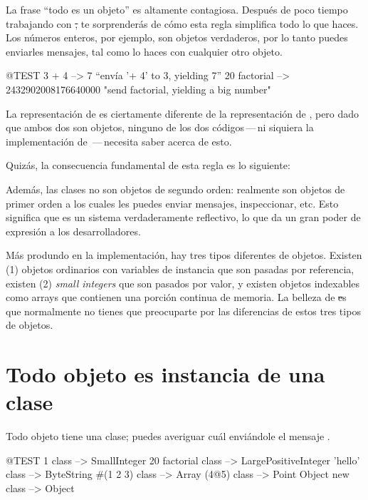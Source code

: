 \documentclass[a4paper,10pt,twoside]{book}
\begin{document}

La frase ``todo es un objeto'' es altamente contagiosa.
Despu\'es de poco tiempo trabajando con \st, te sorprender\'as de c\'omo esta regla simplifica todo lo que haces.  
Los n\'umeros enteros, por ejemplo, son objetos verdaderos, por lo tanto puedes enviarles mensajes, tal como lo haces con cualquier otro objeto.


\begin{code}{@TEST}
3 + 4            --> 7    ``env\'ia '+ 4' to 3, yielding 7''
20 factorial  --> 2432902008176640000   "send factorial, yielding a big number"
\end{code}

La representaci\'on de  es ciertamente diferente de la representaci\'on de , pero dado que ambos dos son objetos, ninguno de los dos c\'odigos\,---\,ni siquiera la implementaci\'on de \,---\,necesita saber acerca de esto.  

Quiz\'as, la consecuencia fundamental de esta regla es lo siguiente:

Adem\'as, las clases no son objetos de segundo orden: realmente son objetos de primer orden a los cuales les puedes enviar mensajes, inspeccionar, etc.
Esto significa que \pharo es un sistema verdaderamente reflectivo, lo que da un gran poder de expresi\'on a los desarrolladores.

M\'as produndo en la implementaci\'on, hay tres tipos diferentes de objetos. Existen (1) objetos ordinarios con variables de instancia que son pasadas por referencia, existen (2) \emph{small integers} %
que son pasados por valor, y existen objetos indexables como arrays que contienen una porci\'on continua de memoria. La belleza de \st es que normalmente no tienes que preocuparte por las diferencias de estos tres tipos de objetos. 

\section{Todo objeto es instancia de una clase}


Todo objeto tiene una clase; puedes averiguar cu\'al envi\'andole el mensaje .

\begin{code}{@TEST}
1 class                 --> SmallInteger
20 factorial class --> LargePositiveInteger
'hello' class          --> ByteString
#(1 2 3) class       --> Array
(4@5) class         --> Point
Object new class --> Object
\end{code}
\end{document}
